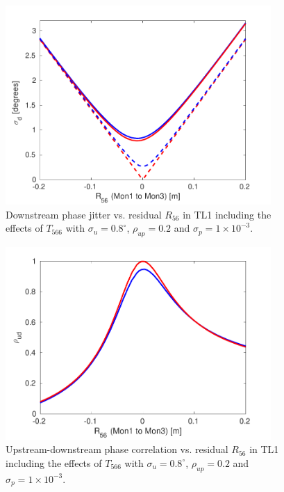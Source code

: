 \begin{figure}
  \centering
  \includegraphics[width=0.9\textwidth]{Figures/propagation/jitVsR56_t566}
  \caption{Downstream phase jitter vs. residual \(R_{56}\) in TL1 including the effects of \(T_{566}\) with \(\sigma_u = 0.8^\circ\), \(\rho_{up}=0.2\) and \(\sigma_p = 1 \times 10^{-3}\).}
  \label{f:jitVsR56_t566}
\end{figure}

\begin{figure}
  \centering
  \includegraphics[width=0.9\textwidth]{Figures/propagation/corrVsR56_t566}
  \caption{Upstream-downstream phase correlation vs. residual \(R_{56}\) in TL1 including the effects of \(T_{566}\)  with \(\sigma_u = 0.8^\circ\), \(\rho_{up}=0.2\) and \(\sigma_p = 1 \times 10^{-3}\).}
  \label{f:corrVsR56_t566}
\end{figure}

